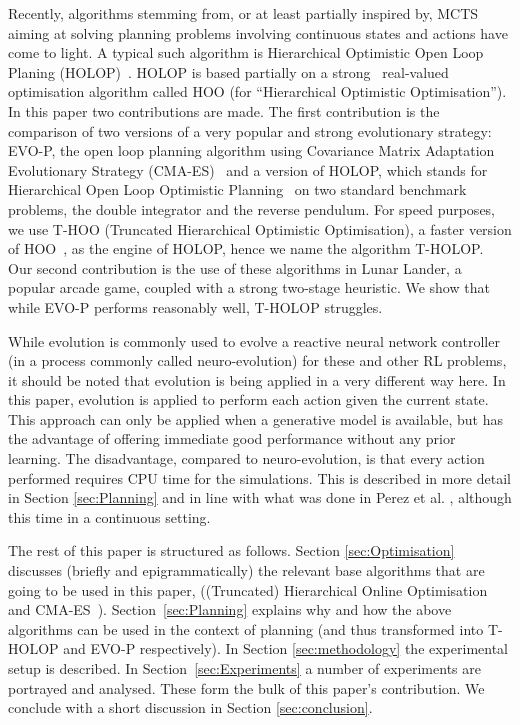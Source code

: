 \documentclass[conference]{IEEEtran}
\begin{document}
Recently, algorithms stemming from, or at least partially inspired by, MCTS aiming at solving planning problems involving continuous states and actions have come to light. A typical such algorithm is Hierarchical Optimistic Open Loop Planing (HOLOP)~\cite{weinstein2012bandit}. HOLOP is based partially on a strong~\cite{hoo2011} real-valued optimisation algorithm called HOO (for ``Hierarchical Optimistic Optimisation''). In this paper two contributions are made. The first contribution is the comparison of two versions of a very popular and strong evolutionary strategy: EVO-P, the open loop planning algorithm using Covariance Matrix Adaptation Evolutionary Strategy (CMA-ES)~\cite{hansen2003reducing} and a version of HOLOP, which stands for Hierarchical Open Loop Optimistic Planning~\cite{hoo2011} on two standard benchmark problems, the double integrator and the reverse pendulum.  For speed purposes, we use T-HOO (Truncated Hierarchical Optimistic Optimisation), a faster version of HOO~\cite{hoo2011}, as the engine of HOLOP, hence we name the algorithm T-HOLOP.  Our second contribution is the use of these algorithms in Lunar Lander, a popular arcade game, coupled with a strong two-stage heuristic. We show that while EVO-P performs reasonably well, T-HOLOP struggles. 

While evolution is commonly used to evolve a reactive neural network controller (in a process commonly called neuro-evolution) for these and other RL problems,
it should be noted that evolution is being applied in a very different way here. In this paper, evolution is applied to perform each action given the current state.  This approach can only be applied when a generative
model is available, but has the advantage of offering immediate good performance without any
prior learning.  The disadvantage, compared to neuro-evolution, is that every action performed requires
CPU time for the simulations.  This is described in more detail in Section \ref{sec:Planning} and in line with what was done in Perez et al. \cite{perez2013rolling}, although this time in a continuous setting. 

The rest of this paper is structured as follows.  Section \ref{sec:Optimisation} discusses (briefly and epigrammatically) the relevant base algorithms that are going to be used in this paper, ((Truncated) Hierarchical Online Optimisation~\cite{hoo2011} and CMA-ES~\cite{hansen2003reducing}).
Section~\ref{sec:Planning} explains why and how the above algorithms can be used in the context of planning (and thus transformed into T-HOLOP and EVO-P respectively).  In Section \ref{sec:methodology} the experimental setup is described. In Section~\ref{sec:Experiments} a number of experiments are portrayed and analysed.  These form the bulk of this paper's contribution. We conclude with a short discussion in Section \ref{sec:conclusion}. 
\end{document}
